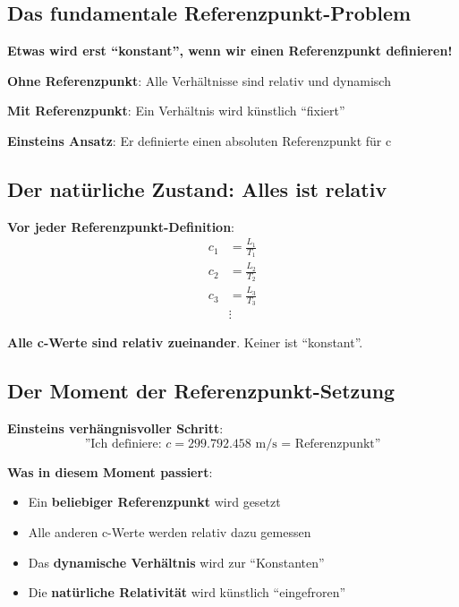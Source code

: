 	\subsection{Das fundamentale Referenzpunkt-Problem}
	
	\begin{tcolorbox}[colback=red!5!white,colframe=red!75!black,title=Die Referenzpunkt-Illusion]
		\textbf{Etwas wird erst ``konstant'', wenn wir einen Referenzpunkt definieren!}
		
		\textbf{Ohne Referenzpunkt}: Alle Verhältnisse sind relativ und dynamisch
		
		\textbf{Mit Referenzpunkt}: Ein Verhältnis wird künstlich ``fixiert''
		
		\textbf{Einsteins Ansatz}: Er definierte einen absoluten Referenzpunkt für c
	\end{tcolorbox}
	
	\subsection{Der natürliche Zustand: Alles ist relativ}
	
	\textbf{Vor jeder Referenzpunkt-Definition}:
	\begin{align}
		c_1 &= \frac{L_1}{T_1} \\
		c_2 &= \frac{L_2}{T_2} \\
		c_3 &= \frac{L_3}{T_3} \\
		&\vdots
	\end{align}
	
	\textbf{Alle c-Werte sind relativ zueinander}. Keiner ist ``konstant''.
	
	\subsection{Der Moment der Referenzpunkt-Setzung}
	
	\textbf{Einsteins verhängnisvoller Schritt}:
	\begin{equation}
		\text{''Ich definiere: } c = 299.792.458 \text{ m/s = Referenzpunkt''}
	\end{equation}
	
	\textbf{Was in diesem Moment passiert}:
	\begin{itemize}
		\item Ein \textbf{beliebiger Referenzpunkt} wird gesetzt
		\item Alle anderen c-Werte werden relativ dazu gemessen
		\item Das \textbf{dynamische Verhältnis} wird zur ``Konstanten''
		\item Die \textbf{natürliche Relativität} wird künstlich ``eingefroren''
	\end{itemize}
	
